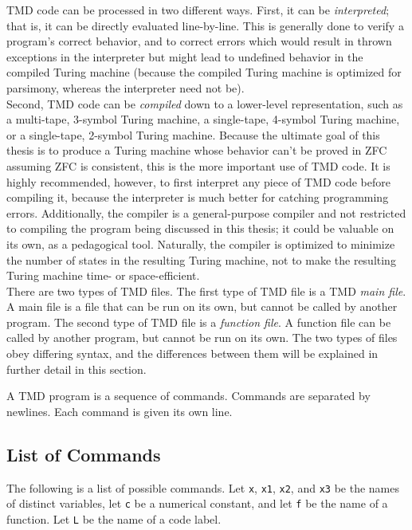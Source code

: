 \documentclass{report}
\begin{document}
TMD code can be processed in two different ways. First, it can be \emph{interpreted}; that is, it can be directly evaluated line-by-line. This is generally done to verify a program's correct behavior, and to correct errors which would result in thrown exceptions in the interpreter but might lead to undefined behavior in the compiled Turing machine (because the compiled Turing machine is optimized for parsimony, whereas the interpreter need not be). \\

Second, TMD code can be \emph{compiled} down to a lower-level representation, such as a multi-tape, 3-symbol Turing machine, a single-tape, 4-symbol Turing machine, or a single-tape, 2-symbol Turing machine. Because the ultimate goal of this thesis is to produce a Turing machine whose behavior can't be proved in ZFC assuming ZFC is consistent, this is the more important use of TMD code. It is highly recommended, however, to first interpret any piece of TMD code before compiling it, because the interpreter is much better for catching programming errors. Additionally, the compiler is a general-purpose compiler and not restricted to compiling the program being discussed in this thesis; it could be valuable on its own, as a pedagogical tool. Naturally, the compiler is optimized to minimize the number of states in the resulting Turing machine, not to make the resulting Turing machine time- or space-efficient. \\

There are two types of TMD files. The first type of TMD file is a TMD \emph{main file}. A main file is a file that can be run on its own, but cannot be called by another program. The second type of TMD file is a \emph{function file}. A function file can be called by another program, but cannot be run on its own. The two types of files obey differing syntax, and the differences between them will be explained in further detail in this section.

A TMD program is a sequence of commands. Commands are separated by newlines. Each command is given its own line. \\

\subsection{List of Commands}

The following is a list of possible commands. Let \texttt{x}, \texttt{x1}, \texttt{x2}, and \texttt{x3} be the names of distinct variables, let \texttt{c} be a numerical constant, and let \texttt{f} be the name of a function. Let \texttt{L} be the name of a code label. \\
\end{document}
